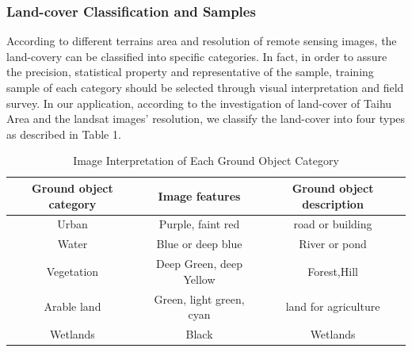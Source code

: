 \documentclass{elsart}
\begin{document}
\subsubsection{Land-cover Classification and Samples}
According to different terrains area and resolution of remote sensing images, the land-covery can be classified into specific categories. 
In fact, in order to assure the precision, statistical property and representative of the sample, training sample of each category should be selected through visual interpretation and field survey\cite{YuXiu-Lan1999}.
In our application, according to the investigation of land-cover of Taihu Area and the landsat images' resolution, we classify the land-cover into four types as described in Table 1.
\begin{table}[h]
\scriptsize{
\begin{center}
\begin{tabular}[bt]{|c|c|c|}\hline

Ground object category	& Image features	& Ground object description \\ \hline
Urban			& Purple, faint red	& road or building \\ \hline
Water			& Blue or deep blue	&River or pond \\ \hline
Vegetation		& Deep Green, deep Yellow		& Forest,Hill \\ \hline
Arable land		& Green, light green, cyan	& land for agriculture \\ \hline
Wetlands		& Black		& Wetlands \\ \hline
\end{tabular}
\caption{Image Interpretation of Each Ground Object Category}
\label{specification}
\end{center}
}
\end{table}
\par
\end{document}
